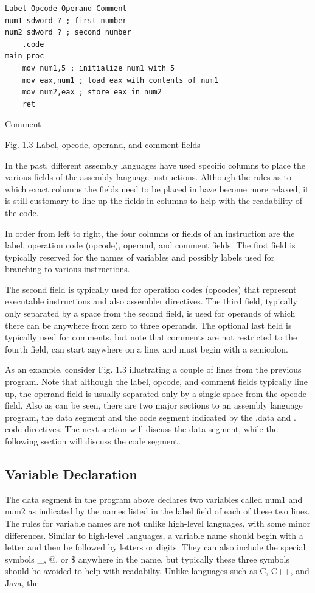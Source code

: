 \documentclass[10pt]{book}
\begin{document}
\begin{verbatim}
Label Opcode Operand Comment
num1 sdword ? ; first number
num2 sdword ? ; second number
    .code
main proc
    mov num1,5 ; initialize num1 with 5
    mov eax,num1 ; load eax with contents of num1
    mov num2,eax ; store eax in num2
    ret
\end{verbatim}

Comment

Fig. 1.3 Label, opcode, operand, and comment fields

In the past, different assembly languages have used specific columns to place the various fields of the assembly language instructions. Although the rules as to which exact columns the fields need to be placed in have become more relaxed, it is still customary to line up the fields in columns to help with the readability of the code.

In order from left to right, the four columns or fields of an instruction are the label, operation code (opcode), operand, and comment fields. The first field is typically reserved for the names of variables and possibly labels used for branching to various instructions.

The second field is typically used for operation codes (opcodes) that represent executable instructions and also assembler directives. The third field, typically only separated by a space from the second field, is used for operands of which there can be anywhere from zero to three operands. The optional last field is typically used for comments, but note that comments are not restricted to the fourth field, can start anywhere on a line, and must begin with a semicolon.

As an example, consider Fig. 1.3 illustrating a couple of lines from the previous program. Note that although the label, opcode, and comment fields typically line up, the operand field is usually separated only by a single space from the opcode field. Also as can be seen, there are two major sections to an assembly language program, the data segment and the code segment indicated by the .data and . code directives. The next section will discuss the data segment, while the following section will discuss the code segment.

\subsection{Variable Declaration}
The data segment in the program above declares two variables called num1 and num2 as indicated by the names listed in the label field of each of these two lines. The rules for variable names are not unlike high-level languages, with some minor differences. Similar to high-level languages, a variable name should begin with a letter and then be followed by letters or digits. They can also include the special symbols \_, @, or \$ anywhere in the name, but typically these three symbols should be avoided to help with readabilty. Unlike languages such as C, C++, and Java, the
\end{document}

